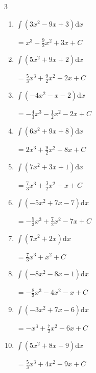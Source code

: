 \begin{multicols}{3}
\begin{enumerate}
        $\displaystyle =-3x^{3}+\frac{1}{2}x^{2}-3x+ C$

  \item $\displaystyle \int \left( 3x^{2}-9x+3 \right) \mathrm{d}x$

        $\displaystyle =x^{3}-\frac{9}{2}x^{2}+3x+ C$

  \item $\displaystyle \int \left( 5x^{2}+9x+2 \right) \mathrm{d}x$

        $\displaystyle =\frac{5}{3}x^{3}+\frac{9}{2}x^{2}+2x+ C$

  \item $\displaystyle \int \left( -4x^{2}-x-2 \right) \mathrm{d}x$

        $\displaystyle =-\frac{4}{3}x^{3}-\frac{1}{2}x^{2}-2x+ C$

  \item $\displaystyle \int \left( 6x^{2}+9x+8 \right) \mathrm{d}x$

        $\displaystyle =2x^{3}+\frac{9}{2}x^{2}+8x+ C$

  \item $\displaystyle \int \left( 7x^{2}+3x+1 \right) \mathrm{d}x$

        $\displaystyle =\frac{7}{3}x^{3}+\frac{3}{2}x^{2}+x+ C$

  \item $\displaystyle \int \left( -5x^{2}+7x-7 \right) \mathrm{d}x$

        $\displaystyle =-\frac{5}{3}x^{3}+\frac{7}{2}x^{2}-7x+ C$

  \item $\displaystyle \int \left( 7x^{2}+2x \right) \mathrm{d}x$

        $\displaystyle =\frac{7}{3}x^{3}+x^{2}+ C$

  \item $\displaystyle \int \left( -8x^{2}-8x-1 \right) \mathrm{d}x$

        $\displaystyle =-\frac{8}{3}x^{3}-4x^{2}-x+ C$

\columnbreak %

  \item $\displaystyle \int \left( -3x^{2}+7x-6 \right) \mathrm{d}x$

        $\displaystyle =-x^{3}+\frac{7}{2}x^{2}-6x+ C$

  \item $\displaystyle \int \left( 5x^{2}+8x-9 \right) \mathrm{d}x$

        $\displaystyle =\frac{5}{3}x^{3}+4x^{2}-9x+ C$


\end{enumerate}
\end{multicols}
